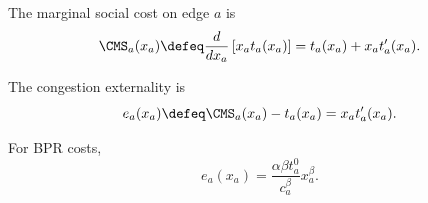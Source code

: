 \begin{definition}
The marginal social cost on edge $a$ is
\[
\CMS_a(x_a) \defeq \frac{d}{dx_a}\left[x_a t_a(x_a)\right]
= t_a(x_a) + x_a t_a'(x_a).
\]
\end{definition}

\begin{definition}
The congestion externality is
\[
e_a(x_a) \defeq \CMS_a(x_a) - t_a(x_a) = x_a t_a'(x_a).
\]
\end{definition}

\begin{proposition}
For BPR costs,
\[
e_a(x_a) = \frac{\alpha \beta t_a^0}{c_a^\beta}x_a^\beta.
\]
\end{proposition}
